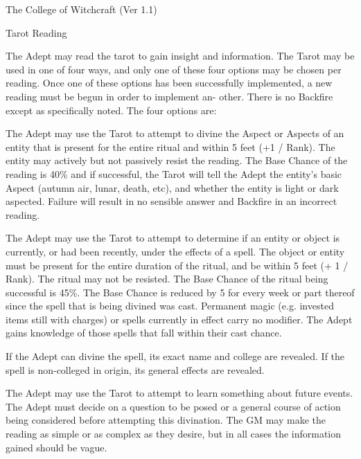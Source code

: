 \begin{Chapter}{The College of Witchcraft (Ver 1.1)}
\begin{ritual}[Q-2]{Tarot Reading}
\begin{effects}
The Adept may read the tarot to gain insight and information.  The
Tarot may be used in one of four ways, and only one of these four
options may be chosen per reading. Once one of these options has been
successfully implemented, a new reading must be begun in order to
implement an- other.  There is no Backfire except as specifically
noted. The four options are:
\begin{Description}
\item[Divining Aspects] The Adept may use the Tarot to attempt to
  divine the Aspect or Aspects of an entity that is present for the
  entire ritual and within 5 feet (+1 / Rank).  The entity may
  actively but not passively resist the reading.  The Base Chance of
  the reading is 40\% and if successful, the Tarot will tell the Adept
  the entity’s basic Aspect (autumn air, lunar, death, etc), and
  whether the entity is light or dark aspected.  Failure will result
  in no sensible answer and Backfire in an incorrect reading.

\item[Divining Enchantment] The Adept may use the Tarot to attempt to
  determine if an entity or object is currently, or had been recently,
  under the effects of a spell. The object or entity must be present
  for the entire duration of the ritual, and be within 5 feet (+ 1 /
  Rank).  The ritual may not be resisted.  The Base Chance of the
  ritual being successful is 45\%.  The Base Chance is reduced by 5
  for every week or part thereof since the spell that is being divined
  was cast.  Permanent magic (e.g.  invested items still with charges)
  or spells currently in effect carry no modifier.  The Adept gains
  knowledge of those spells that fall within their cast chance.

  If the Adept can divine the spell, its exact name and college are
  revealed.  If the spell is non-colleged in origin, its general
  effects are revealed.

\item[Divining the Future] The Adept may use the Tarot to attempt to
  learn something about future events.  The Adept must decide on a
  question to be posed or a general course of action being considered
  before attempting this divination.  The GM may make the reading as
  simple or as complex as they desire, but in all cases the
  information gained should be vague.


\end{Description}
\end{effects}
\end{ritual}
\end{Chapter}
